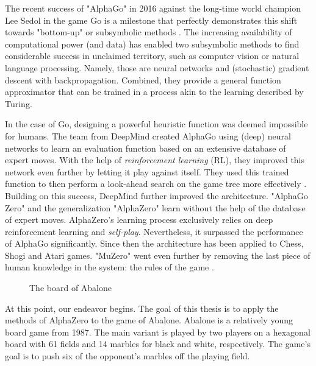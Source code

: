 The recent success of "AlphaGo" in 2016 against the long-time world champion Lee Sedol \cite{deepmind_match_nodate} in the game Go is a milestone that perfectly demonstrates this shift towards "bottom-up" or subsymbolic methods \cite{nilsson_artificial_1998}. The increasing availability of computational power (and data) has enabled two subsymbolic methods to find considerable success in unclaimed territory, such as computer vision or natural language processing. Namely, those are neural networks and (stochastic) gradient descent with backpropagation. Combined, they provide a general function approximator that can be trained in a process akin to the learning described by Turing.

In the case of Go, designing a powerful heuristic function was deemed impossible for humans. The team from DeepMind created AlphaGo using (deep) neural networks to learn an evaluation function based on an extensive database of expert moves. With the help of \textit{reinforcement learning} (RL), they improved this network even further by letting it play against itself. They used this trained function to then perform a look-ahead search on the game tree more effectively \cite{silver_mastering_2017}. Building on this success, DeepMind further improved the architecture. "AlphaGo Zero" and the generalization "AlphaZero" learn without the help of the database of expert moves. AlphaZero's learning process exclusively relies on deep reinforcement learning and \textit{self-play}.
Nevertheless, it surpassed the performance of AlphaGo significantly. Since then the architecture has been applied to Chess, Shogi and Atari games. "MuZero" went even further by removing the last piece of human knowledge in the system: the rules of the game \cite{schrittwieser_mastering_2020}.

\begin{figure}[H]
    \centering
    \caption{The board of Abalone}
    \label{abalone_boards}
\end{figure}


At this point, our endeavor begins. The goal of this thesis is to apply the methods of AlphaZero to the game of Abalone. Abalone is a relatively young board game from 1987. The main variant is played by two players on a hexagonal board with 61 fields and 14 marbles for black and white, respectively. The game's goal is to push six of the opponent's marbles off the playing field.

